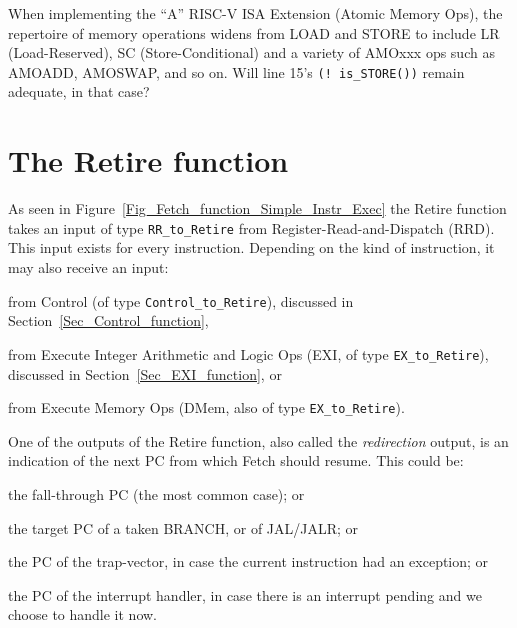 When implementing the ``A'' RISC-V ISA Extension (Atomic Memory Ops),
the repertoire of memory operations widens from LOAD and STORE to
include LR (Load-Reserved), SC (Store-Conditional) and a variety of
AMOxxx ops such as AMOADD, AMOSWAP, and so on.
Will line 15's {\tt (!~is\_STORE())} remain adequate, in that case?

\Endexercise


\section{The Retire function}

\label{Sec_Retire_function}


As seen in Figure~\ref{Fig_Fetch_function_Simple_Instr_Exec} the
Retire function takes an input of type \verb|RR_to_Retire| from
Register-Read-and-Dispatch (RRD).  This input exists for every
instruction.  Depending on the kind of instruction, it may also
receive an input:

\begin{tightlist}

  \item from Control (of type \verb|Control_to_Retire|), discussed in
    Section~\ref{Sec_Control_function},

  \item from Execute Integer Arithmetic and Logic Ops (EXI, of type
    \verb|EX_to_Retire|), discussed in Section~\ref{Sec_EXI_function},
    or

  \item from Execute Memory Ops (DMem, also of type
    \verb|EX_to_Retire|).

\end{tightlist}

One of the outputs of the Retire function, also called the
\emph{redirection} output, is an indication of the next PC from which
Fetch should resume.  This could be:

\begin{tightlist}

  \item the fall-through PC (the most common case); or

  \item the target PC of a taken BRANCH, or of JAL/JALR; or

  \item the PC of the trap-vector, in case the current instruction had
    an exception; or

  \item the PC of the interrupt handler, in case there is an
    interrupt pending and we choose to handle it now.
\end{tightlist}

